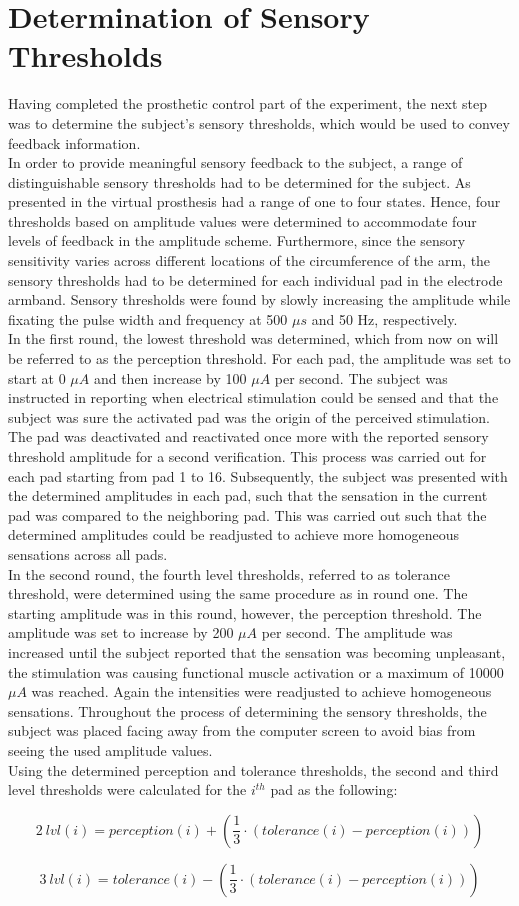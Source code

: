 
\section{Determination of Sensory Thresholds}

Having completed the prosthetic control part of the experiment, the next step was to determine the subject's sensory thresholds, which would be used to convey feedback information. \\
In order to provide meaningful sensory feedback to the subject, a range of distinguishable sensory thresholds had to be determined for the subject. As presented in  the virtual prosthesis had a range of one to four states. Hence, four thresholds based on amplitude values were determined to accommodate four levels of feedback in the amplitude scheme. Furthermore, since the sensory sensitivity varies across different locations of the circumference of the arm, the sensory thresholds had to be determined for each individual pad in the electrode armband. Sensory thresholds were found by slowly increasing the amplitude while fixating the pulse width and frequency at 500 $\mu s $ and 50 Hz, respectively. \\
In the first round, the lowest threshold was determined, which from now on will be referred to as the perception threshold. For each pad, the amplitude was set to start at 0 $\mu A $ and then increase by 100 $\mu A $ per second. The subject was instructed in reporting when electrical stimulation could be sensed and that the subject was sure the activated pad was the origin of the perceived stimulation. The pad was deactivated and reactivated once more with the reported sensory threshold amplitude for a second verification. This process was carried out for each pad starting from pad 1 to 16. Subsequently, the subject was presented with the determined amplitudes in each pad, such that the sensation in the current pad was compared to the neighboring pad. This was carried out such that the determined amplitudes could be readjusted to achieve more homogeneous sensations across all pads.  \\
In the second round, the fourth level thresholds, referred to as tolerance threshold, were determined using the same procedure as in round one. The starting amplitude was in this round, however, the perception threshold. The amplitude was set to increase by 200 $\mu A $ per second. The amplitude was increased until the subject reported that the sensation was becoming unpleasant, the stimulation was causing functional muscle activation or a maximum of 10000 $\mu A $ was reached. Again the intensities were readjusted to achieve homogeneous sensations. Throughout the process of determining the sensory thresholds, the subject was placed facing away from the computer screen to avoid bias from seeing the used amplitude values.  \\ 
Using the determined perception and tolerance thresholds, the second and third level thresholds were calculated for the $i^{th}$ pad as the following:

\begin{equation}
2~lvl(i) = perception(i) + (\frac{1}{3} \cdot (tolerance(i) - perception(i)))
\end{equation}

\begin{equation}
3~lvl(i) = tolerance(i) - (\frac{1}{3} \cdot (tolerance(i) - perception(i)))
\end{equation}


       